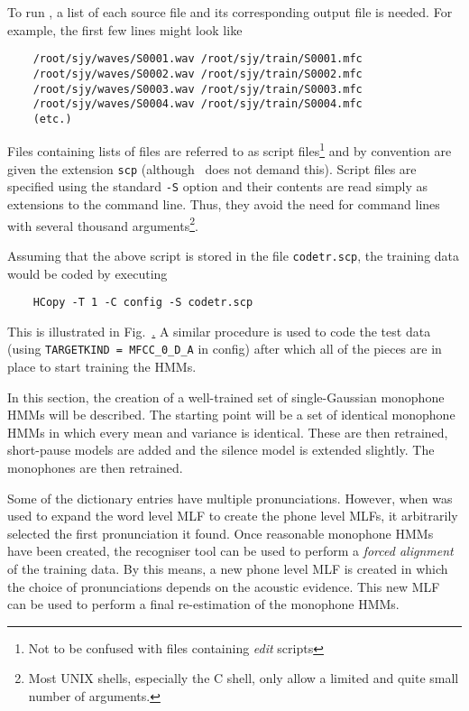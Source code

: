 To run ,  a list of
each source file and its corresponding output file is needed.  For example,
the first few lines might look like
\begin{verbatim}
    /root/sjy/waves/S0001.wav /root/sjy/train/S0001.mfc
    /root/sjy/waves/S0002.wav /root/sjy/train/S0002.mfc
    /root/sjy/waves/S0003.wav /root/sjy/train/S0003.mfc
    /root/sjy/waves/S0004.wav /root/sjy/train/S0004.mfc
    (etc.)
\end{verbatim}
Files containing lists of files are referred to as script files\footnote{
Not to be confused with files containing \textit{edit} scripts
}
and
by convention are given the extension \texttt{scp} (although 
\HTK\ does not demand this).  Script files are specified using the standard
\texttt{-S} option and their contents are read simply as extensions
to the command line.  Thus, they avoid the need for command lines with
several thousand arguments\footnote{
Most UNIX shells, especially the C shell, only allow a limited and
quite small number of arguments.}.


\noindent
Assuming that the above script is stored in the file \texttt{codetr.scp},
the training data would be coded by executing
\begin{verbatim}
    HCopy -T 1 -C config -S codetr.scp
\end{verbatim}
This is illustrated in Fig.~\href{f:step5}. A similar procedure is
used to code the test data (using \verb|TARGETKIND = MFCC_0_D_A| in
config) after which all of the pieces are in place to start training
the HMMs.
 


In this section, the creation of a well-trained set of single-Gaussian
monophone HMMs will be described.  The starting point will be
a set of identical monophone HMMs in which every mean and variance is
identical.  These are then retrained, short-pause models are
added and the silence model is extended slightly.  The monophones
are then retrained.

Some of the dictionary entries have multiple pronunciations.  However,
when  was used to expand the word level MLF to create the
phone level MLFs, it arbitrarily selected the first pronunciation it found.
Once reasonable monophone HMMs have been created, the recogniser tool
 can be used to perform a \textit{forced alignment} 
of
the training data.  By this means, a new phone level MLF is created in which
the choice of pronunciations depends on the acoustic evidence.  This new
MLF can be used to perform a final re-estimation of the monophone HMMs.

